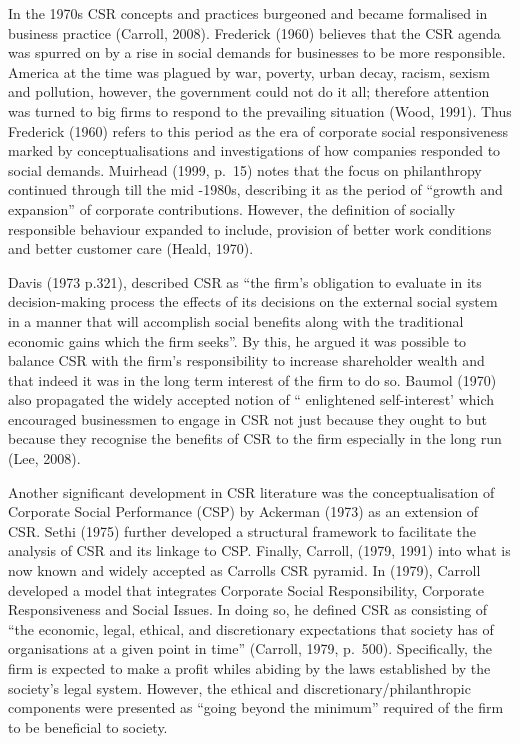 \documentclass[
]{mitthesis}
\begin{document}
In the 1970s CSR concepts and practices burgeoned and became formalised in business practice (Carroll, 2008). Frederick (1960) believes that the CSR agenda was spurred on by a rise in social demands for businesses to be more responsible. America at the time was plagued by war, poverty, urban decay, racism, sexism and pollution, however, the government could not do it all; therefore attention was turned to big firms to respond to the prevailing situation (Wood, 1991). Thus Frederick (1960) refers to this period as the era of corporate social responsiveness marked by conceptualisations and investigations of how companies responded to social demands. Muirhead (1999, p.~15) notes that the focus on philanthropy continued through till the mid -1980s, describing it as the period of ``growth and expansion'' of corporate contributions. However, the definition of socially responsible behaviour expanded to include, provision of better work conditions and better customer care (Heald, 1970).

Davis (1973 p.321), described CSR as ``the firm's obligation to evaluate in its decision-making process the effects of its decisions on the external social system in a manner that will accomplish social benefits along with the traditional economic gains which the firm seeks''. By this, he argued it was possible to balance CSR with the firm's responsibility to increase shareholder wealth and that indeed it was in the long term interest of the firm to do so. Baumol (1970) also propagated the widely accepted notion of `` enlightened self-interest' which encouraged businessmen to engage in CSR not just because they ought to but because they recognise the benefits of CSR to the firm especially in the long run (Lee, 2008).

Another significant development in CSR literature was the conceptualisation of Corporate Social Performance (CSP) by Ackerman (1973) as an extension of CSR. Sethi (1975) further developed a structural framework to facilitate the analysis of CSR and its linkage to CSP. Finally, Carroll, (1979, 1991) into what is now known and widely accepted as Carrolls CSR pyramid. In (1979), Carroll developed a model that integrates Corporate Social Responsibility, Corporate Responsiveness and Social Issues. In doing so, he defined CSR as consisting of ``the economic, legal, ethical, and discretionary expectations that society has of organisations at a given point in time'' (Carroll, 1979, p.~500). Specifically, the firm is expected to make a profit whiles abiding by the laws established by the society's legal system. However, the ethical and discretionary/philanthropic components were presented as ``going beyond the minimum'' required of the firm to be beneficial to society.
\end{document}
